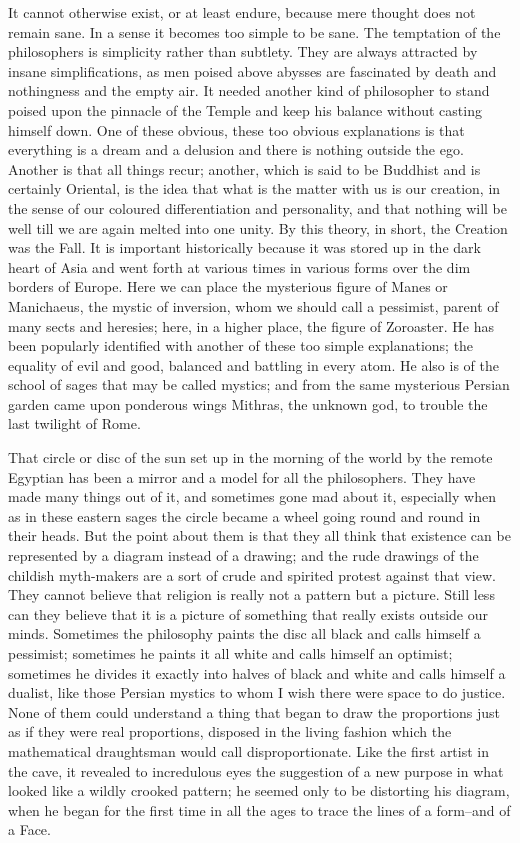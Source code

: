 It cannot otherwise exist, or at least endure, because mere thought does not remain sane. In a sense it becomes too simple to be sane. The temptation of the philosophers is simplicity rather than subtlety. They are always attracted by insane simplifications, as men poised above abysses are fascinated by death and nothingness and the empty air. It needed another kind of philosopher to stand poised upon the pinnacle of the Temple and keep his balance without casting himself down. One of these obvious, these too obvious explanations is that everything is a dream and a delusion and there is nothing outside the ego. Another is that all things recur; another, which is said to be Buddhist and is certainly Oriental, is the idea that what is the matter with us is our creation, in the sense of our coloured differentiation and personality, and that nothing will be well till we are again melted into one unity. By this theory, in short, the Creation was the Fall. It is important historically because it was stored up in the dark heart of Asia and went forth at various times in various forms over the dim borders of Europe. Here we can place the mysterious figure of Manes or Manichaeus, the mystic of inversion, whom we should call a pessimist, parent of many sects and heresies; here, in a higher place, the figure of Zoroaster. He has been popularly identified with another of these too simple explanations; the equality of evil and good, balanced and battling in every atom. He also is of the school of sages that may be called mystics; and from the same mysterious Persian garden came upon ponderous wings Mithras, the unknown god, to trouble the last twilight of Rome.

That circle or disc of the sun set up in the morning of the world by the remote Egyptian has been a mirror and a model for all the philosophers. They have made many things out of it, and sometimes gone mad about it, especially when as in these eastern sages the circle became a wheel going round and round in their heads. But the point about them is that they all think that existence can be represented by a diagram instead of a drawing; and the rude drawings of the childish myth-makers are a sort of crude and spirited protest against that view. They cannot believe that religion is really not a pattern but a picture. Still less can they believe that it is a picture of something that really exists outside our minds. Sometimes the philosophy paints the disc all black and calls himself a pessimist; sometimes he paints it all white and calls himself an optimist; sometimes he divides it exactly into halves of black and white and calls himself a dualist, like those Persian mystics to whom I wish there were space to do justice. None of them could understand a thing that began to draw the proportions just as if they were real proportions, disposed in the living fashion which the mathematical draughtsman would call disproportionate. Like the first artist in the cave, it revealed to incredulous eyes the suggestion of a new purpose in what looked like a wildly crooked pattern; he seemed only to be distorting his diagram, when he began for the first time in all the ages to trace the lines of a form--and of a Face.

